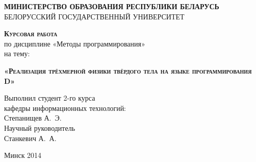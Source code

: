 \begin{titlepage}
\newpage

\begin{center}
\textsc{\textbf{МИНИСТЕРСТВО ОБРАЗОВАНИЯ РЕСПУБЛИКИ БЕЛАРУСЬ}} \\
\vspace{1cm}
БЕЛОРУССКИЙ ГОСУДАРСТВЕННЫЙ УНИВЕРСИТЕТ \\
\end{center}
 
\vspace{8em}

\begin{center}
\Large \textsc{\textbf{Курсовая работа}} \\
по дисциплине  «Методы программирования» \\
на тему:
\end{center}

\vspace{2.5em}
 
\begin{center}
\textsc{\textbf{«Реализация трёхмерной физики твёрдого тела \linebreak на языке программирования D»}}
\end{center}

\vspace{12em}
 
\begin{flushleft}
Выполнил студент 2-го курса \\
кафедры информационных технологий: \\%
Степанищев А.~Э.~\\
\vspace{1.5em}
Научный руководитель \\
Станкевич А.~А.~\\
\vspace{1.5em}
\end{flushleft}
 
\vspace{\fill}

\begin{center}
Минск 2014
\end{center}

\end{titlepage}